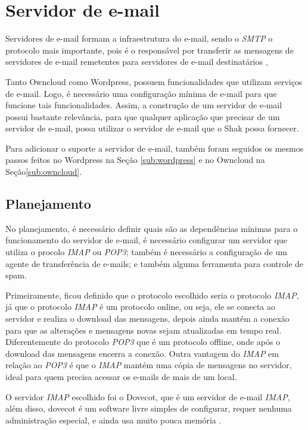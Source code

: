 \section{Servidor de e-mail}
\label{sub:e-mail}

Servidores de e-mail formam a infraestrutura do e-mail, sendo o \textit{SMTP} o protocolo
mais importante, pois é o responsável por transferir as mensagens de servidores
de e-mail remetentes para servidores de e-mail destinatários \cite{kurose2010redes}, 

Tanto Owncloud como Wordpress, possuem funcionalidades que utilizam serviços 
de e-mail. Logo, é necessário uma configuração mínima de e-mail para que funcione 
tais funcionalidades. Assim, a construção de um servidor de e-mail 
possui bastante relevância, para que qualquer aplicação que precisar de um 
servidor de e-mail, possa utilizar o servidor de e-mail que o Shak possa fornecer.

Para adicionar o suporte a servidor de e-mail, também foram seguidos os mesmos passos
feitos no Wordpress na Seção \ref{sub:wordpress} e no Owncloud na Seção\ref{sub:owncloud}. 

\subsection{Planejamento}

No planejamento, é necessário definir
quais são as dependências mínimas para o funcionamento do servidor de e-mail, é 
necessário configurar um servidor que utiliza o procolo \textit{IMAP} ou \textit{POP3};
também é necessário a configuração de um agente de transferência de e-mails; e também
alguma ferramenta para controle de spam.

Primeiramente, ficou definido que o protocolo escolhido seria o protocolo \textit{IMAP}, já
que o protocolo \textit{IMAP} é um protocolo online, ou seja, ele se conecta ao servidor
e realiza o download das mensagens, depois ainda  mantém a conexão para que
as alterações e mensagens novas sejam atualizadas em tempo real. Diferentemente do
protocolo \textit{POP3} que é um protocolo offline, onde após o download das mensagens encerra
a conexão. Outra vantagem do \textit{IMAP} em relação ao \textit{POP3} é que o 
\textit{IMAP} mantém uma cópia de mensagens no servidor, ideal para quem precisa 
acessar os e-mails de mais de um local.

O servidor \textit{IMAP} escolhido foi o Dovecot, que é um servidor de e-mail
\textit{IMAP}, além disso, dovecot é um software livre simples de configurar, requer nenhuma
administração especial, e ainda usa muito pouca memória \cite{dovecot}. 

